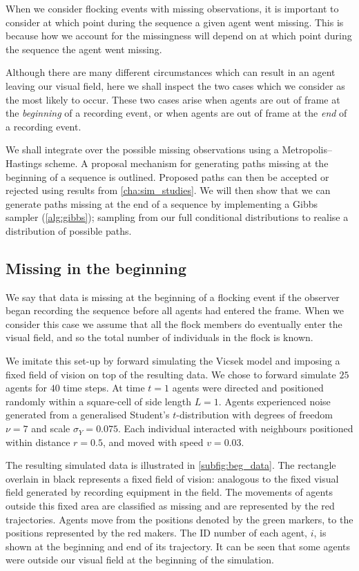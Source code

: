 When we consider flocking events with missing observations, it is important to
consider at which point during the sequence a given agent went missing. This is
because how we account for the missingness will depend on at which point during
the sequence the agent went missing.

Although there are many different circumstances which can result in an agent
leaving our visual field, here we shall inspect the two cases which we
consider as the most likely to occur. These two cases arise when agents are
out of frame at the \emph{beginning} of a recording event, or when
agents are out of frame at the \emph{end} of a recording event.

We shall integrate over the possible missing observations using a
Metropolis--Hastings scheme. A proposal mechanism for generating paths missing
at the beginning of a sequence is outlined. Proposed paths can then be accepted
or rejected using results from \cref{cha:sim_studies}. We will then show that
we can generate paths missing at the end of a sequence by implementing a Gibbs
sampler (\cref{alg:gibbs}); sampling from our full conditional distributions to
realise a distribution of possible paths.

\subsection{Missing in the beginning}
\label{ssec:beg_missing}

We say that data is missing at the beginning of a flocking event if the
observer began recording the sequence before all agents had entered the frame.
When we consider this case we assume that all the flock members do eventually
enter the visual field, and so the total number of individuals in the flock is
known.

We imitate this set-up by forward simulating the Vicsek model and imposing a
fixed field of vision on top of the resulting data. We chose to forward
simulate $25$ agents for $40$ time steps. At time $t=1$ agents were directed
and positioned randomly within a square-cell of side length $L=1$. Agents
experienced noise generated from a generalised Student's $t$-distribution with
degrees of freedom $\nu=7$ and scale $\sigma_Y=0.075$. Each individual
interacted with neighbours positioned within distance $r=0.5$, and moved with
speed $v=0.03$.

The resulting simulated data is illustrated in \cref{subfig:beg_data}. The
rectangle overlain in black represents a fixed field of vision: analogous to
the fixed visual field generated by recording equipment in the field. The
movements of agents outside this fixed area are classified as missing and are
represented by the red trajectories. Agents move from the positions denoted by
the green markers, to the positions represented by the red makers. The ID
number of each agent, $i$, is shown at the beginning and end of its trajectory.
It can be seen that some agents were outside our visual field at the beginning
of the simulation. 

